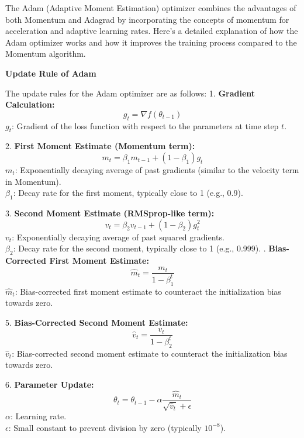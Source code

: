 \begin{qsolve}
    \begin{qsolve}[]
        The Adam (Adaptive Moment Estimation) optimizer combines the advantages of both Momentum and Adagrad by incorporating the concepts of momentum for acceleration and adaptive learning rates. Here’s a detailed explanation of how the Adam optimizer works and how it improves the training process compared to the Momentum algorithm.

        \textbf{Update Rule of Adam}

        The update rules for the Adam optimizer are as follows:
        1. \textbf{Gradient Calculation:}
        \[
        g_t = \nabla f(\theta_{t-1})
        \]
        \( g_t \): Gradient of the loss function with respect to the parameters at time step \( t \).

        2. \textbf{First Moment Estimate (Momentum term):}
        \[
        m_t = \beta_1 m_{t-1} + (1 - \beta_1) g_t
        \]
        \( m_t \): Exponentially decaying average of past gradients (similar to the velocity term in Momentum). \\
        \( \beta_1 \): Decay rate for the first moment, typically close to 1 (e.g., 0.9).

        3. \textbf{Second Moment Estimate (RMSprop-like term):}
        \[
        v_t = \beta_2 v_{t-1} + (1 - \beta_2) g_t^2
        \]
        \( v_t \): Exponentially decaying average of past squared gradients. \\
        \( \beta_2 \): Decay rate for the second moment, typically close to 1 (e.g., 0.999).
        . \textbf{Bias-Corrected First Moment Estimate:}
        \[
        \hat{m}_t = \frac{m_t}{1 - \beta_1^t}
        \]
        \( \hat{m}_t \): Bias-corrected first moment estimate to counteract the initialization bias towards zero.

        5. \textbf{Bias-Corrected Second Moment Estimate:}
        \[
        \hat{v}_t = \frac{v_t}{1 - \beta_2^t}
        \]
        \( \hat{v}_t \): Bias-corrected second moment estimate to counteract the initialization bias towards zero.

        6. \textbf{Parameter Update:}
        \[
        \theta_t = \theta_{t-1} - \alpha \frac{\hat{m}_t}{\sqrt{\hat{v}_t} + \epsilon}
        \]
        \( \alpha \): Learning rate. \\
        \( \epsilon \): Small constant to prevent division by zero (typically \(10^{-8}\)).


\end{qsolve}
\end{qsolve}
